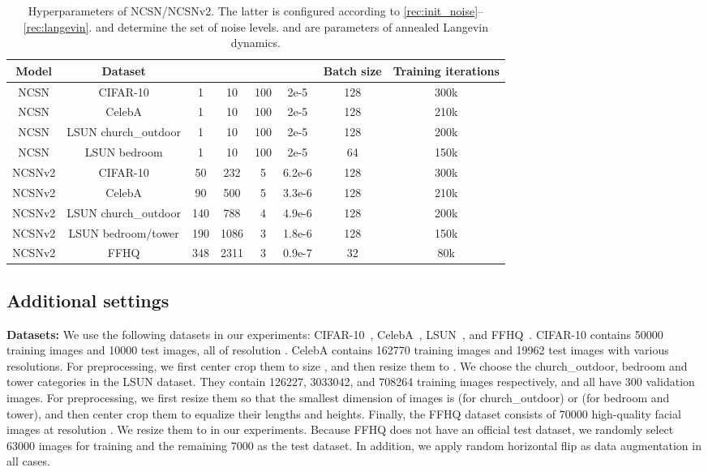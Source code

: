 \documentclass{article}
\begin{document}
\begin{table}[H]
    \vspace{-1.2em}
    \caption{Hyperparameters of NCSN/NCSNv2. The latter is configured according to \cref{rec:init_noise}--\ref{rec:langevin}.  and  determine the set of noise levels.  and  are parameters of annealed Langevin dynamics.}\label{tab:hyperparameters}
    \begin{center}
    \begin{adjustbox}{max width=\linewidth}
    \begin{tabular}{cccccccc}
    \toprule
    Model & Dataset &  &  &  &  & Batch size & Training iterations\\ 
    \midrule
    NCSN & CIFAR-10  & 1 & 10 &  100 & 2e-5 & 128 & 300k\\
    NCSN & CelebA  & 1 & 10 &  100 & 2e-5 & 128 & 210k\\
    NCSN & LSUN church\_outdoor  & 1 & 10 & 100 & 2e-5 & 128 & 200k\\
    NCSN & LSUN bedroom  & 1 & 10 & 100 & 2e-5 & 64 & 150k\\
    NCSNv2 & CIFAR-10  & 50 & 232 & 5 & 6.2e-6 & 128 & 300k\\
    NCSNv2 & CelebA  & 90 & 500 & 5 & 3.3e-6 & 128 & 210k\\
    NCSNv2 & LSUN church\_outdoor  & 140 & 788 & 4 & 4.9e-6 & 128 & 200k\\
    NCSNv2 & LSUN bedroom/tower  & 190 & 1086 & 3 & 1.8e-6 & 128 & 150k\\
    NCSNv2 & FFHQ  & 348 & 2311 & 3 & 0.9e-7 & 32 & 80k\\
    \bottomrule
    \end{tabular}
    \end{adjustbox}
    \end{center}
\end{table}

\subsection{Additional settings}\label{app:settings}
\textbf{Datasets:} We use the following datasets in our experiments: CIFAR-10~\cite{krizhevsky2009learning}, CelebA~\cite{liu2015faceattributes}, LSUN~\cite{yu2015lsun}, and FFHQ~\cite{karras2019style}. CIFAR-10 contains 50000 training images and 10000 test images, all of resolution . CelebA contains 162770 training images and 19962 test images with various resolutions. For preprocessing, we first center crop them to size , and then resize them to . We choose the church\_outdoor, bedroom and tower categories in the LSUN dataset. They contain 126227, 3033042, and 708264 training images respectively, and all have 300 validation images. For preprocessing, we first resize them so that the smallest dimension of images is  (for church\_outdoor) or  (for bedroom and tower), and then center crop them to equalize their lengths and heights. Finally, the FFHQ dataset consists of 70000 high-quality facial images at resolution . We resize them to  in our experiments. Because FFHQ does not have an official test dataset, we randomly select 63000 images for training and the remaining 7000 as the test dataset. In addition, we apply random horizontal flip as data augmentation in all cases.
\end{document}
